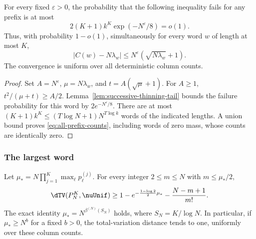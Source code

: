 \begin{lemma}
\label{cor:iterated-hypergeom}
For every fixed $\varepsilon>0$, the probability that the following inequality fails for any prefix is at most
\[
 2(K+1)k^K\exp(-N^\varepsilon/8)=o(1).
\]
Thus, with probability $1-o(1)$,
simultaneously for every word \(w\) of length at most \(K\),
\begin{equation}
\label{eq:all-prefix-counts}
 |C(w)-N\lambda_w|\le
 N^\varepsilon(\sqrt{N\lambda_w}+1).
\end{equation}
The convergence is uniform over all deterministic column counts.
\end{lemma}

\begin{proof}
Set \(A=N^\varepsilon\), \(\mu=N\lambda_w\), and
\(t=A(\sqrt\mu+1)\). For \(A\ge1\),
\(t^2/(\mu+t)\ge A/2\).
Lemma~\ref{lem:successive-thinning-tail} bounds the failure probability
for this word by \(2e^{-N^\varepsilon/8}\).
There are at most \((K+1)k^{K}\le (T\log N+1)N^{T\log k}\)
words of the indicated lengths. A union bound proves
\eqref{eq:all-prefix-counts}, including words of zero mass, whose counts
are identically zero.
\end{proof}

\subsubsection{The largest word}

\begin{proposition}
\label{prop:largest-prefix}
Let
\(\mu_*=N\prod_{j=1}^{K}\max_\ell p^{(j)}_\ell\).
For every integer \(2\le m\le N\) with \(m\le\mu_*/2\),
\begin{equation}
\label{eq:finite-largest-word-tv}
 \dTV(P_N^{K},\nuUnif)
 \ge1-e^{-\frac{1-\log2}{2}\mu_*}-\frac{N-m+1}{m!}.
\end{equation}
The exact identity $\mu_*=N^{\beta^{(N)}(S_N)}$ holds, where $S_N=K/\log N$. In particular, if \(\mu_*\ge N^b\) for a fixed \(b>0\), the
total-variation distance tends to one, uniformly over these column counts.
\end{proposition}

